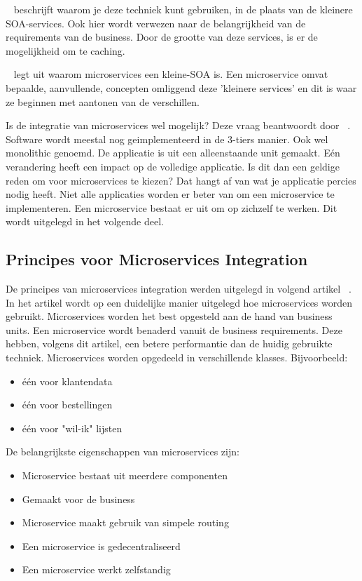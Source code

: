 ~\cite{AlAtrash2018} beschrijft waarom je deze techniek kunt gebruiken, in de plaats van de kleinere SOA-services. Ook hier wordt verwezen naar de belangrijkheid van de requirements van de business. Door de grootte van deze services, is er de mogelijkheid om te caching. 

~\cite{devoteam2018} legt uit waarom microservices een kleine-SOA is. Een microservice omvat bepaalde, aanvullende, concepten omliggend deze 'kleinere services' en dit is waar ze beginnen met aantonen van de verschillen.

Is de integratie van microservices wel mogelijk? Deze vraag beantwoordt door ~\cite{VanBart2018}. Software wordt meestal nog geimplementeerd in de 3-tiers manier. Ook wel monolithic genoemd. De applicatie is uit een alleenstaande unit gemaakt. Eén verandering heeft een impact op de volledige applicatie. Is dit dan een geldige reden om voor microservices te kiezen? Dat hangt af van wat je applicatie percies nodig heeft. Niet alle applicaties worden er beter van om een microservice te implementeren. Een microservice  bestaat er uit om op zichzelf te werken. Dit wordt uitgelegd in het volgende deel.

\subsection{Principes voor Microservices Integration}

De principes van microservices integration werden uitgelegd in volgend artikel ~\cite{Aradhye2018}.
In het artikel wordt op een duidelijke manier uitgelegd hoe microservices worden gebruikt. Microservices worden het best opgesteld aan de hand van business units. Een microservice wordt benaderd vanuit de business requirements. Deze hebben, volgens dit artikel, een betere performantie dan de huidig gebruikte techniek. Microservices worden opgedeeld in verschillende klasses. Bijvoorbeeld:
\begin{itemize}
	\item één voor klantendata
	\item één voor bestellingen
	\item één voor "wil-ik" lijsten
\end{itemize}

De belangrijkste eigenschappen van microservices zijn:
\begin{itemize}
	\item Microservice bestaat uit meerdere componenten
	\item Gemaakt voor de business
	\item Microservice maakt gebruik van simpele routing
	\item Een microservice is gedecentraliseerd
	\item Een microservice werkt zelfstandig
\end{itemize}

